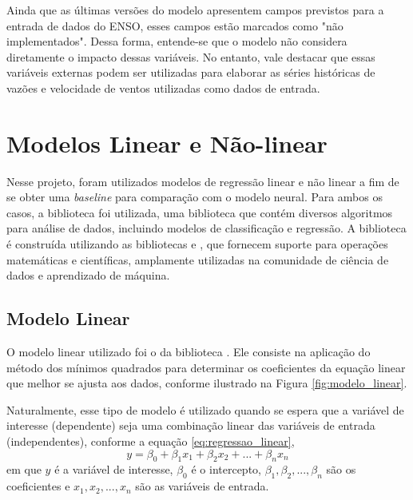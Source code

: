 Ainda que as últimas versões do modelo apresentem campos previstos para a entrada de dados do ENSO, esses campos
estão marcados como "não implementados". Dessa forma, entende-se que o modelo não considera diretamente o impacto 
dessas variáveis. No entanto, vale destacar que essas variáveis externas podem ser utilizadas para elaborar as séries históricas de 
vazões e velocidade de ventos utilizadas como dados de entrada. 


\newpage
\section{Modelos Linear e Não-linear}
Nesse projeto, foram utilizados modelos de regressão linear e não linear a fim de se obter uma \textit{baseline} para
comparação com o modelo neural. Para ambos os casos, a biblioteca  foi utilizada, uma biblioteca
que contém diversos algoritmos para análise de dados, incluindo modelos de classificação e regressão. A biblioteca
é construída utilizando as bibliotecas  e , que fornecem suporte para operações
matemáticas e científicas, amplamente utilizadas na comunidade de ciência de dados e aprendizado de máquina.

\subsection{Modelo Linear}
O modelo linear utilizado foi o  da biblioteca . Ele consiste na
aplicação do método dos mínimos quadrados para determinar os coeficientes da equação linear que melhor se ajusta aos dados,
conforme ilustrado na Figura \ref{fig:modelo_linear}.
\begin{figure}[!ht]
	{}
	{}
\end{figure}

Naturalmente, esse tipo de modelo é utilizado quando se espera que a variável de interesse (dependente) seja uma combinação linear
das variáveis de entrada (independentes), conforme a equação \ref{eq:regressao_linear},
\begin{equation}
\label{eq:regressao_linear}
y = \beta_0 + \beta_1 x_1 + \beta_2 x_2 + ... + \beta_n x_n
\end{equation}
em que $y$ é a variável de interesse, 
$\beta_0$ é o intercepto, $\beta_1, \beta_2, ..., \beta_n$ são os coeficientes e $x_1, x_2, ..., x_n$ são as variáveis de entrada.

